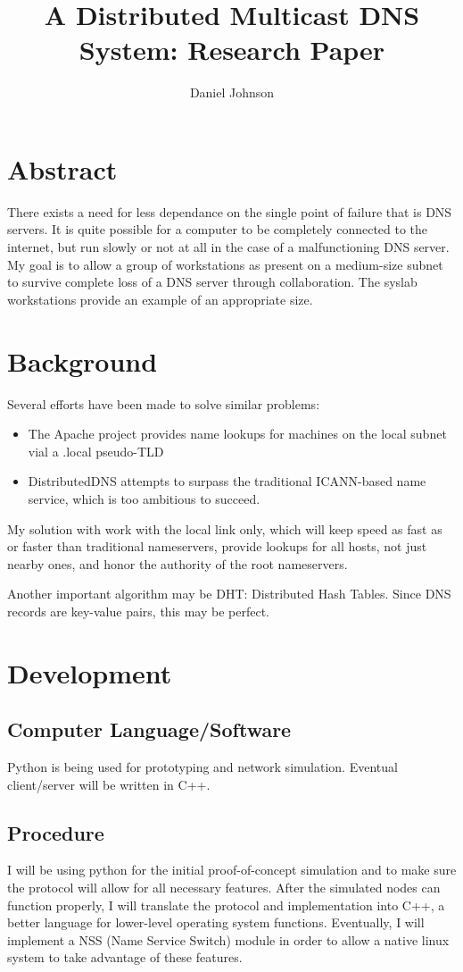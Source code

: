 \documentclass[12pt,letterpaper,titlepage]{article}
\begin{document}
\author{Daniel Johnson}
\title{A Distributed Multicast DNS System: Research Paper}
\maketitle
\section{Abstract}
There exists a need for less dependance on the single point of failure that is DNS servers. It is quite possible for a computer to be completely connected to the internet, but run slowly or not at all in the case of a malfunctioning DNS server. My goal is to allow a group of workstations as present on a medium-size subnet to survive complete loss of a DNS server through collaboration. The syslab workstations provide an example of an appropriate size.
\section{Background}
Several efforts have been made to solve similar problems:
\begin{itemize}
\item The Apache project provides name lookups for machines on the local subnet vial a .local pseudo-TLD
\item DistributedDNS attempts to surpass the traditional ICANN-based name service, which is too ambitious to succeed.
\end{itemize}
My solution with work with the local link only, which will keep speed as fast as or faster than traditional nameservers, provide lookups for all hosts, not just nearby ones, and honor the authority of the root nameservers.

Another important algorithm may be DHT: Distributed Hash Tables. Since DNS records are key-value pairs, this may be perfect.
\section{Development}
\subsection{Computer Language/Software}
Python is being used for prototyping and network simulation. Eventual client/server will be written in C++.
\subsection{Procedure}
I will be using python for the initial proof-of-concept simulation and to make sure the protocol will allow for all necessary features. After the simulated nodes can function properly, I will translate the protocol and implementation into C++, a better language for lower-level operating system functions. Eventually, I will implement a NSS (Name Service Switch) module in order to allow a native linux system to take advantage of these features.
\end{document}
